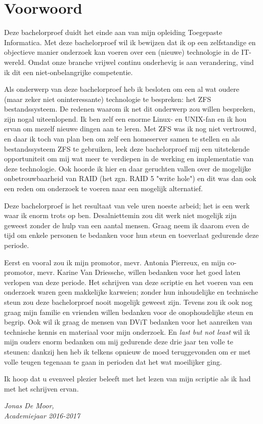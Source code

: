 
\chapter*{Voorwoord}
\label{ch:voorwoord}


Deze bachelorproef duidt het einde aan van mijn opleiding Toegepaste Informatica. Met deze bachelorproef wil ik bewijzen dat ik op een zelfstandige en objectieve manier onderzoek kan voeren over een (nieuwe) technologie in de IT-wereld. Omdat onze branche vrijwel continu onderhevig is aan verandering, vind ik dit een niet-onbelangrijke competentie. 

Als onderwerp van deze bachelorproef heb ik besloten om een al wat oudere (maar zeker niet oninteressante) technologie te bespreken: het ZFS bestandssysteem. De redenen waarom ik net dit onderwerp zou willen bespreken, zijn nogal uiteenlopend. Ik ben zelf een enorme Linux- en UNIX-fan en ik hou ervan om mezelf nieuwe dingen aan te leren. Met ZFS was ik nog niet vertrouwd, en daar ik toch van plan ben om zelf een homeserver samen te stellen en als bestandssysteem ZFS te gebruiken, leek deze bachelorproef mij een uitstekende opportuniteit om mij wat meer te verdiepen in de werking en implementatie van deze technologie. Ook hoorde ik hier en daar geruchten vallen over de mogelijke onbetrouwbaarheid van RAID (het zgn. RAID 5 "write hole") en dit was dan ook een reden om onderzoek te voeren naar een mogelijk alternatief.

Deze bachelorproef is het resultaat van vele uren noeste arbeid; het is een werk waar ik enorm trots op ben. Desalniettemin zou dit werk niet mogelijk zijn geweest zonder de hulp van een aantal mensen. Graag neem ik daarom even de tijd om enkele personen te bedanken voor hun steun en toeverlaat gedurende deze periode. 

Eerst en vooral zou ik mijn promotor, mevr. Antonia Pierreux, en mijn co-promotor, mevr. Karine Van Driessche, willen bedanken voor het goed laten verlopen van deze periode. Het schrijven van deze scriptie en het voeren van een onderzoek waren geen makkelijke karweien; zonder hun inhoudelijke en technische steun zou deze bachelorproef nooit mogelijk geweest zijn. Tevens zou ik ook nog graag mijn familie en vrienden willen bedanken voor de onophoudelijke steun en begrip. Ook wil ik graag de mensen van DViT bedanken voor het aanreiken van technische kennis en materiaal voor mijn onderzoek. En \textit{last but not least} wil ik mijn ouders enorm bedanken om mij gedurende deze drie jaar ten volle te steunen: dankzij hen heb ik telkens opnieuw de moed teruggevonden om er met volle teugen tegenaan te gaan in perioden dat het wat moeilijker ging.

Ik hoop dat u evenveel plezier beleeft met het lezen van mijn scriptie als ik had met het schrijven ervan.

\begin{flushright}
  \textit{Jonas De Moor,} \\ 
  \textit{Academiejaar 2016-2017}
\end{flushright}
